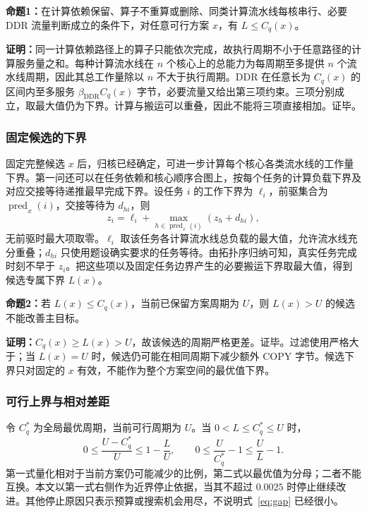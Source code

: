\textbf{命题1：}在计算依赖保留、算子不重算或删除、同类计算流水线每核串行、必要 DDR 流量判断成立的条件下，对任意可行方案 $x$，有 $L\le C_q(x)$。

\textbf{证明：}同一计算依赖路径上的算子只能依次完成，故执行周期不小于任意路径的计算服务量之和。每种计算流水线在 $n$ 个核心上的总能力为每周期至多提供 $n$ 个流水线周期，因此其总工作量除以 $n$ 不大于执行周期。DDR 在任意长为 $C_q(x)$ 的区间内至多服务 $\beta_{\mathrm{DDR}} C_q(x)$ 字节，必要流量又给出第三项约束。三项分别成立，取最大值仍为下界。计算与搬运可以重叠，因此不能将三项直接相加。证毕。

\subsubsection{固定候选的下界}
固定完整候选 $x$ 后，归核已经确定，可进一步计算每个核心各类流水线的工作量下界。第一问还可以在任务依赖和核心顺序合图上，按每个任务的计算负载下界及对应交接等待递推最早完成下界。设任务 $i$ 的工作下界为 $\ell_i$，前驱集合为 $\operatorname{pred}_x(i)$，交接等待为 $d_{hi}$，则
\begin{equation}
 z_i=\ell_i+\max_{h\in\operatorname{pred}_x(i)}(z_h+d_{hi}),
 \label{eq:taskbound}
\end{equation}
无前驱时最大项取零。$\ell_i$ 取该任务各计算流水线总负载的最大值，允许流水线充分重叠；$d_{hi}$ 只使用题设确实要求的任务等待。由拓扑序归纳可知，真实任务完成时刻不早于 $z_i$。把这些项以及固定任务边界产生的必要搬运下界取最大值，得到候选专属下界 $L(x)$。

\textbf{命题2：}若 $L(x)\le C_q(x)$，当前已保留方案周期为 $U$，则 $L(x)>U$ 的候选不能改善主目标。

\textbf{证明：}$C_q(x)\ge L(x)>U$，故该候选的周期严格更差。证毕。过滤使用严格大于；当 $L(x)=U$ 时，候选仍可能在相同周期下减少额外 COPY 字节。候选下界只对固定的 $x$ 有效，不能作为整个方案空间的最优值下界。

\subsubsection{可行上界与相对差距}
令 $C_q^*$ 为全局最优周期，当前可行周期为 $U$。当 $0<L\le C_q^*\le U$ 时，
\begin{equation}
 0\le\frac{U-C_q^*}{U}\le1-\frac{L}{U},\qquad
 0\le\frac{U}{C_q^*}-1\le\frac{U}{L}-1.
 \label{eq:gap}
\end{equation}
第一式量化相对于当前方案仍可能减少的比例，第二式以最优值为分母；二者不能互换。本文以第一式右侧作为近界停止依据，当其不超过 $0.0025$ 时停止继续改进。其他停止原因只表示预算或搜索机会用尽，不说明式~\eqref{eq:gap} 已经很小。

